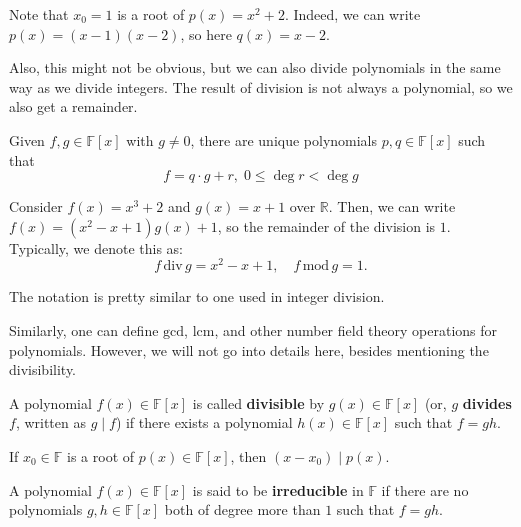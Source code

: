 \documentclass[../lecture-notes-148x210.tex]{subfiles}
\begin{document}
\begin{example}
    Note that $x_0=1$ is a root of $p(x) = x^2+2$. Indeed, we can write $p(x) = (x-1)(x-2)$, so here $q(x) = x-2$.
\end{example}

Also, this might not be obvious, but we can also divide polynomials in the same way as we divide integers. The result of division is not always a polynomial, so we also get a remainder.

\begin{theorem}
    Given $f,g \in \mathbb{F}[x]$ with $g \neq 0$, there are unique polynomials $p,q \in \mathbb{F}[x]$ such that 
    \begin{equation*}
        f = q \cdot g + r, \; 0 \leq \deg r < \deg g
    \end{equation*}
\end{theorem}

\begin{example}
    Consider $f(x) = x^3+2$ and $g(x) = x+1$ over $\mathbb{R}$. Then, we can write $f(x) = (x^2-x+1)g(x) + 1$, so the remainder of the division is $1$. Typically, we denote this as:
    \begin{equation*}
        f \, \text{div} \, g = x^2-x+1, \quad f \, \text{mod} \, g = 1.
    \end{equation*}

    The notation is pretty similar to one used in integer division.
\end{example}

Similarly, one can define $\text{gcd}$, $\text{lcm}$, and other number field theory operations for polynomials. However, we will not go into details here, besides mentioning the divisibility.

\begin{definition}
    A polynomial $f(x) \in \mathbb{F}[x]$ is called \textbf{divisible} by $g(x) \in \mathbb{F}[x]$ (or, $g$ \textbf{divides} $f$, written as $g \mid f$) if there exists a polynomial $h(x) \in \mathbb{F}[x]$ such that $f=gh$.
\end{definition}

\begin{theorem}
    If $x_0 \in \mathbb{F}$ is a root of $p(x) \in \mathbb{F}[x]$, then $(x-x_0) \mid p(x)$.
\end{theorem}

\begin{definition}
    A polynomial $f(x) \in \mathbb{F}[x]$ is said to be \textbf{irreducible} in $\mathbb{F}$ if there are no polynomials $g,h \in \mathbb{F}[x]$ both of degree more than $1$ such that $f = gh$.
\end{definition}
\end{document}
